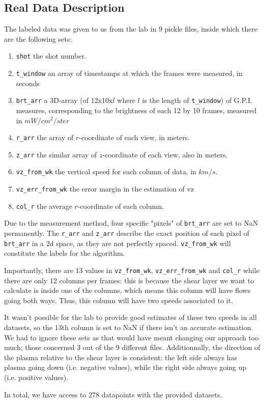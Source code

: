 \documentclass[10pt,conference]{IEEEtran}
\begin{document}
\subsection{Real Data Description}
The labeled data was given to us from the lab in 9 pickle files, inside which there are the following sets:
\begin{enumerate}
  \item \texttt{shot} the shot number.
  \item \texttt{t\_window} an array of timestamps at which the frames were measured, in seconds
  \item \texttt{brt\_arr} a 3D-array (of 12x10x$l$ where $l$ is the length of \texttt{t\_window}) of G.P.I. measures, corresponding to the brightness of each 12 by 10 frames, measured in $mW/cm^2/ster$
  \item \texttt{r\_arr} the array of $r$-coordinate of each view, in meters.
  \item \texttt{z\_arr} the similar array of $z$-coordinate of each view, also in meters.
  \item \texttt{vz\_from\_wk} the vertical speed for each column of data, in $km/s$.
  \item \texttt{vz\_err\_from\_wk} the error margin in the estimation of vz
  \item \texttt{col\_r} the average $r$-coordinate of each column.
\end{enumerate}
Due to the measurement method, four specific "pixels" of \texttt{brt\_arr} are set to NaN permanently. The \texttt{r\_arr} and \texttt{z\_arr} describe the exact position of each pixel of \texttt{brt\_arr} in a 2d space, as they are not perfectly spaced. \texttt{vz\_from\_wk} will constitute the labels for the algorithm.\par
Importantly, there are 13 values in \texttt{vz\_from\_wk}, \texttt{vz\_err\_from\_wk} and \texttt{col\_r} while there are only 12 columns per frames: this is because the shear layer we want to calculate is inside one of the columns, which means this column will have flows going both ways. Thus, this column will have two speeds associated to it. \par
It wasn't possible for the lab to provide good estimates of these two speeds in all datasets, so the 13th column is set to NaN if there isn't an accurate estimation. We had to ignore these sets as that would have meant changing our approach too much; those concerned 3 out of the 9 different files.
Additionnally, the direction of the plasma relative to the shear layer is consistent: the left side always has plasma going down (i.e. negative values), while the right side always going up (i.e. positive values). \par
In total, we have access to 278 datapoints with the provided datasets.
\end{document}
